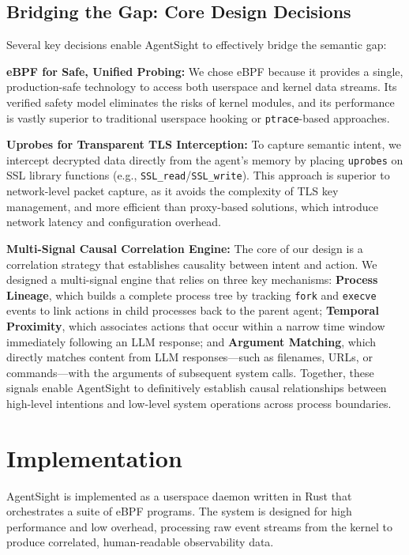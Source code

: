 \subsection{Bridging the Gap: Core Design Decisions}
Several key decisions enable AgentSight to effectively bridge the semantic gap:

\textbf{eBPF for Safe, Unified Probing:} We chose eBPF because it provides a single, production-safe technology to access both userspace and kernel data streams. Its verified safety model eliminates the risks of kernel modules, and its performance is vastly superior to traditional userspace hooking or \texttt{ptrace}-based approaches.

\textbf{Uprobes for Transparent TLS Interception:} To capture semantic intent, we intercept decrypted data directly from the agent's memory by placing \texttt{uprobes} on SSL library functions (e.g., \texttt{SSL\_read}/\texttt{SSL\_write}). This approach is superior to network-level packet capture, as it avoids the complexity of TLS key management, and more efficient than proxy-based solutions, which introduce network latency and configuration overhead.

\textbf{Multi-Signal Causal Correlation Engine:} The core of our design is a correlation strategy that establishes causality between intent and action. We designed a multi-signal engine that relies on three key mechanisms: \textbf{Process Lineage}, which builds a complete process tree by tracking \texttt{fork} and \texttt{execve} events to link actions in child processes back to the parent agent; \textbf{Temporal Proximity}, which associates actions that occur within a narrow time window immediately following an LLM response; and \textbf{Argument Matching}, which directly matches content from LLM responses—such as filenames, URLs, or commands—with the arguments of subsequent system calls. Together, these signals enable AgentSight to definitively establish causal relationships between high-level intentions and low-level system operations across process boundaries.

\section{Implementation}
AgentSight is implemented as a userspace daemon written in Rust that orchestrates a suite of eBPF programs. The system is designed for high performance and low overhead, processing raw event streams from the kernel to produce correlated, human-readable observability data.

